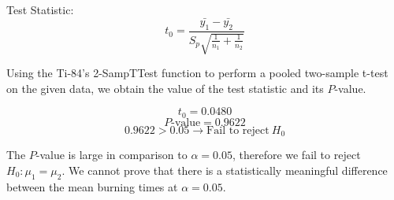 \documentclass[../main.tex]{subfiles}
\begin{document}
\begin{enumerate}[label = (\alph*)]
        Test Statistic:
        \[
            t_0 = \frac{\bar{y_1}-\bar{y_2}}{S_p \sqrt{\frac{1}{n_1} + \frac{1}{n_2}}}
        \]

        Using the Ti-84's 2-SampTTest function to perform a pooled two-sample t-test on the given data, we obtain the value of the test statistic and its $P$-value.

        \[t_0 = 0.0480\]
        \[P\textrm{-value} = 0.9622\]
        \[0.9622 > 0.05 \rightarrow \textrm{Fail to reject} \ H_0\]

        The $P$-value is large in comparison to \(\alpha = 0.05\), therefore we fail to reject \(H_0 : \mu_1 = \mu_2\).
        We cannot prove that there is a statistically meaningful difference between the mean burning times at \(\alpha = 0.05\).
        
\end{enumerate}
\end{document}
